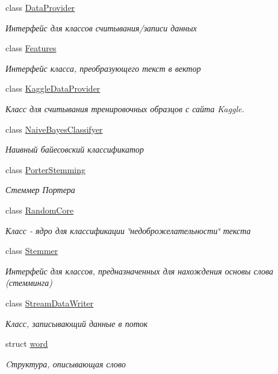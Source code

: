 \begin{DoxyCompactItemize}
class \hyperlink{classtcc_1_1_data_provider}{Data\+Provider}
\begin{DoxyCompactList}\small\item\em Интерфейс для классов считывания/записи данных \end{DoxyCompactList}\item 
class \hyperlink{classtcc_1_1_features}{Features}
\begin{DoxyCompactList}\small\item\em Интерфейс класса, преобразующего текст в вектор \end{DoxyCompactList}\item 
class \hyperlink{classtcc_1_1_kaggle_data_provider}{Kaggle\+Data\+Provider}
\begin{DoxyCompactList}\small\item\em Класс для считывания тренировочных образцов с сайта Kaggle. \end{DoxyCompactList}\item 
class \hyperlink{classtcc_1_1_naive_bayes_classifyer}{Naive\+Bayes\+Classifyer}
\begin{DoxyCompactList}\small\item\em Наивный байесовский классификатор \end{DoxyCompactList}\item 
class \hyperlink{classtcc_1_1_porter_stemming}{Porter\+Stemming}
\begin{DoxyCompactList}\small\item\em Стеммер Портера \end{DoxyCompactList}\item 
class \hyperlink{classtcc_1_1_random_core}{Random\+Core}
\begin{DoxyCompactList}\small\item\em Класс -\/ ядро для классификации \char`\"{}недоброжелательности\char`\"{} текста \end{DoxyCompactList}\item 
class \hyperlink{classtcc_1_1_stemmer}{Stemmer}
\begin{DoxyCompactList}\small\item\em Интерфейс для классов, предназначенных для нахождения основы слова (стемминга) \end{DoxyCompactList}\item 
class \hyperlink{classtcc_1_1_stream_data_writer}{Stream\+Data\+Writer}
\begin{DoxyCompactList}\small\item\em Класс, записывающий данные в поток \end{DoxyCompactList}\item 
struct \hyperlink{structtcc_1_1word}{word}
\begin{DoxyCompactList}\small\item\em Cтруктура, описывающая слово \end{DoxyCompactList}\end{DoxyCompactItemize}

